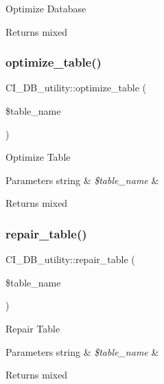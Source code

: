 Optimize Database

\begin{DoxyReturn}{Returns}
mixed 
\end{DoxyReturn}
\mbox{\label{class_c_i___d_b__utility_ac55a0b04bd9408f4b0390320513874b7}} 
\subsubsection{\texorpdfstring{optimize\+\_\+table()}{optimize\_table()}}
{\footnotesize\ttfamily C\+I\+\_\+\+D\+B\+\_\+utility\+::optimize\+\_\+table (\begin{DoxyParamCaption}\item[{}]{\$table\+\_\+name }\end{DoxyParamCaption})}

Optimize Table


\begin{DoxyParams}[1]{Parameters}
string & {\em \$table\+\_\+name} & \\
\hline
\end{DoxyParams}
\begin{DoxyReturn}{Returns}
mixed 
\end{DoxyReturn}
\mbox{\label{class_c_i___d_b__utility_a150e0ea9435f62e905b96a600ebf96b6}} 
\subsubsection{\texorpdfstring{repair\+\_\+table()}{repair\_table()}}
{\footnotesize\ttfamily C\+I\+\_\+\+D\+B\+\_\+utility\+::repair\+\_\+table (\begin{DoxyParamCaption}\item[{}]{\$table\+\_\+name }\end{DoxyParamCaption})}

Repair Table


\begin{DoxyParams}[1]{Parameters}
string & {\em \$table\+\_\+name} & \\
\hline
\end{DoxyParams}
\begin{DoxyReturn}{Returns}
mixed 
\end{DoxyReturn}
\mbox{\label{class_c_i___d_b__utility_a7d509e6257a95658bbe4ecfce73d9577}} 
